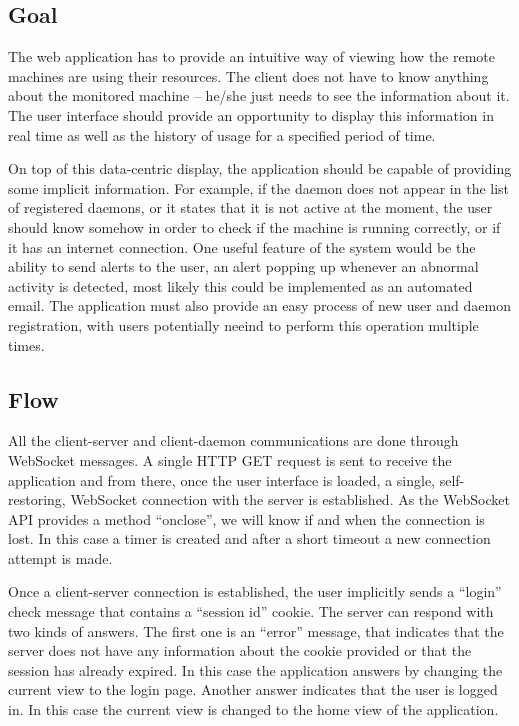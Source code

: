 \documentclass{l3proj}
\begin{document}
\subsection{Goal}

The web application has to provide an intuitive way of viewing how the remote machines are using their resources. The client does not have to know anything about the monitored machine -- he/she just needs to see the information about it. The user interface should provide an opportunity to display this information in real time as well as the history of usage for a specified period of time.

On top of this data-centric display, the application should be capable of providing some implicit information. For example, if the daemon does not appear in the list of registered daemons, or it states that it is not active at the moment, the user should know somehow in order to check if the machine is running correctly, or if it has an internet connection. One useful feature of the system would be the ability to send alerts to the user, an alert popping up whenever an abnormal activity is detected, most likely this could be implemented as an automated email. The application must also provide an easy process of new user and daemon registration, with users potentially neeind to perform this operation multiple times.


\subsection{Flow}

All the client-server and client-daemon communications are done through WebSocket messages. A single HTTP GET request is sent to receive the application and from there, once the user interface is loaded, a single, self-restoring, WebSocket connection with the server is established. As the WebSocket API provides a method ``onclose'', we will know if and when the connection is lost. In this case a timer is created and after a short timeout a new connection attempt is made.

Once a client-server connection is established, the user implicitly sends a ``login'' check message that contains a ``session id'' cookie. The server can respond with two kinds of answers. The first one is an ``error'' message, that indicates that the server does not have any information about the cookie provided or that the session has already expired. In this case the application answers by changing the current view to the login page. Another answer indicates that the user is logged in. In this case the current view is changed to the home view of the application.
\end{document}
